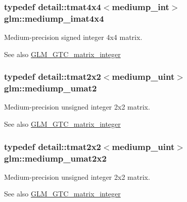 \subsubsection[{mediump\+\_\+imat4x4}]{\setlength{\rightskip}{0pt plus 5cm}typedef detail\+::tmat4x4$<$mediump\+\_\+int$>$ {\bf glm\+::mediump\+\_\+imat4x4}}\label{group__gtc__matrix__integer_gaced73f9aecd6626cdfef5bfb3648b750}
Medium-\/precision signed integer 4x4 matrix. \begin{DoxySeeAlso}{See also}
\hyperlink{group__gtc__matrix__integer}{G\+L\+M\+\_\+\+G\+T\+C\+\_\+matrix\+\_\+integer} 
\end{DoxySeeAlso}
\hypertarget{group__gtc__matrix__integer_gaba421c81f872757146b0adb7a954e349}{}
\subsubsection[{mediump\+\_\+umat2}]{\setlength{\rightskip}{0pt plus 5cm}typedef detail\+::tmat2x2$<$mediump\+\_\+uint$>$ {\bf glm\+::mediump\+\_\+umat2}}\label{group__gtc__matrix__integer_gaba421c81f872757146b0adb7a954e349}
Medium-\/precision unsigned integer 2x2 matrix. \begin{DoxySeeAlso}{See also}
\hyperlink{group__gtc__matrix__integer}{G\+L\+M\+\_\+\+G\+T\+C\+\_\+matrix\+\_\+integer} 
\end{DoxySeeAlso}
\hypertarget{group__gtc__matrix__integer_gad7b4dd36037f24c8c2d7cac7e8ecb729}{}
\subsubsection[{mediump\+\_\+umat2x2}]{\setlength{\rightskip}{0pt plus 5cm}typedef detail\+::tmat2x2$<$mediump\+\_\+uint$>$ {\bf glm\+::mediump\+\_\+umat2x2}}\label{group__gtc__matrix__integer_gad7b4dd36037f24c8c2d7cac7e8ecb729}
Medium-\/precision unsigned integer 2x2 matrix. \begin{DoxySeeAlso}{See also}
\hyperlink{group__gtc__matrix__integer}{G\+L\+M\+\_\+\+G\+T\+C\+\_\+matrix\+\_\+integer} 
\end{DoxySeeAlso}
\hypertarget{group__gtc__matrix__integer_gaa377342a4abe7f415218710e531b2731}{}
